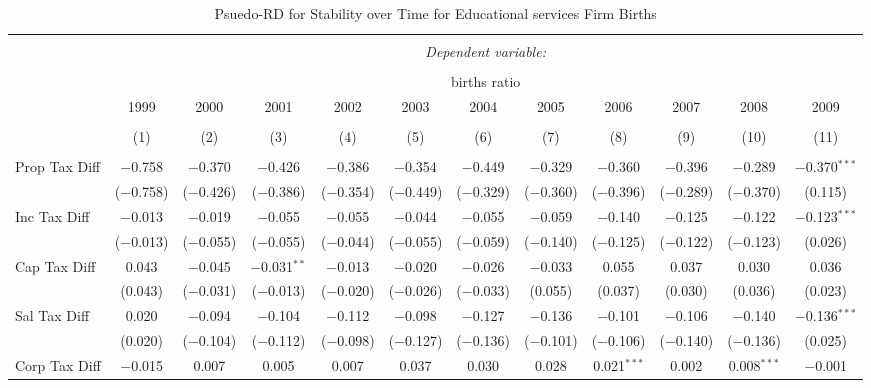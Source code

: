 
\begin{table}[!htbp] \centering 
  \caption{Psuedo-RD for Stability over Time for  Educational services Firm Births} 
  \label{61year} 
\small 
\begin{tabular}{@{\extracolsep{5pt}}lccccccccccc} 
\\[-1.8ex]\hline 
\hline \\[-1.8ex] 
 & \multicolumn{11}{c}{\textit{Dependent variable:}} \\ 
\cline{2-12} 
\\[-1.8ex] & \multicolumn{11}{c}{births ratio} \\ 
 & 1999 & 2000 & 2001 & 2002 & 2003 & 2004 & 2005 & 2006 & 2007 & 2008 & 2009 \\ 
\\[-1.8ex] & (1) & (2) & (3) & (4) & (5) & (6) & (7) & (8) & (9) & (10) & (11)\\ 
\hline \\[-1.8ex] 
 Prop Tax Diff & $-$0.758 & $-$0.370 & $-$0.426 & $-$0.386 & $-$0.354 & $-$0.449 & $-$0.329 & $-$0.360 & $-$0.396 & $-$0.289 & $-$0.370$^{***}$ \\ 
  & ($-$0.758) & ($-$0.426) & ($-$0.386) & ($-$0.354) & ($-$0.449) & ($-$0.329) & ($-$0.360) & ($-$0.396) & ($-$0.289) & ($-$0.370) & (0.115) \\ 
  Inc Tax Diff & $-$0.013 & $-$0.019 & $-$0.055 & $-$0.055 & $-$0.044 & $-$0.055 & $-$0.059 & $-$0.140 & $-$0.125 & $-$0.122 & $-$0.123$^{***}$ \\ 
  & ($-$0.013) & ($-$0.055) & ($-$0.055) & ($-$0.044) & ($-$0.055) & ($-$0.059) & ($-$0.140) & ($-$0.125) & ($-$0.122) & ($-$0.123) & (0.026) \\ 
  Cap Tax Diff & 0.043 & $-$0.045 & $-$0.031$^{**}$ & $-$0.013 & $-$0.020 & $-$0.026 & $-$0.033 & 0.055 & 0.037 & 0.030 & 0.036 \\ 
  & (0.043) & ($-$0.031) & ($-$0.013) & ($-$0.020) & ($-$0.026) & ($-$0.033) & (0.055) & (0.037) & (0.030) & (0.036) & (0.023) \\ 
  Sal Tax Diff & 0.020 & $-$0.094 & $-$0.104 & $-$0.112 & $-$0.098 & $-$0.127 & $-$0.136 & $-$0.101 & $-$0.106 & $-$0.140 & $-$0.136$^{***}$ \\ 
  & (0.020) & ($-$0.104) & ($-$0.112) & ($-$0.098) & ($-$0.127) & ($-$0.136) & ($-$0.101) & ($-$0.106) & ($-$0.140) & ($-$0.136) & (0.025) \\ 
  Corp Tax Diff & $-$0.015 & 0.007 & 0.005 & 0.007 & 0.037 & 0.030 & 0.028 & 0.021$^{***}$ & 0.002 & 0.008$^{***}$ & $-$0.001 \\ 

\end{tabular}
\end{table}
